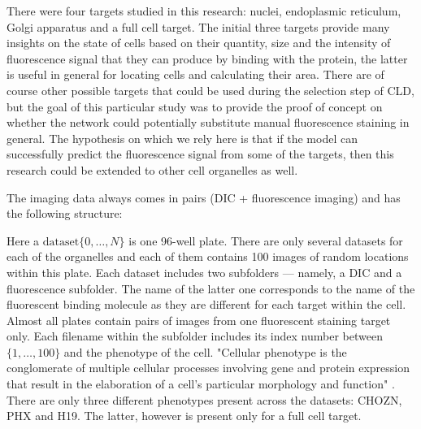 There were four targets studied in this research: nuclei, endoplasmic reticulum, Golgi apparatus and a full cell target. The initial three targets provide many insights on the state of cells based on their quantity, size and the intensity of fluorescence signal that they can produce by binding with the protein, the latter is useful in general for locating cells and calculating their area. There are of course other possible targets that could be used during the selection step of CLD, but the goal of this particular study was to provide the proof of concept on whether the network could potentially substitute manual fluorescence staining in general. The hypothesis on which we rely here is that if the model can successfully predict the fluorescence signal from some of the targets, then this research could be extended to other cell organelles as well.

The imaging data always comes in pairs (DIC + fluorescence imaging) and has the following structure:



Here a $\text{dataset}\{0, \ldots, N\}$ is one 96-well plate. There are only several datasets for each of the organelles and each of them contains 100 images of random locations within this plate. Each dataset includes two subfolders --- namely, a DIC and a fluorescence subfolder. The name of the latter one corresponds to the name of the fluorescent binding molecule as they are different for each target within the cell. Almost all plates contain pairs of images from one fluorescent staining target only. Each filename within the subfolder includes its index number between $\{1, \ldots, 100\}$ and the phenotype of the cell. "Cellular phenotype is the conglomerate of multiple cellular processes involving gene and protein expression that result in the elaboration of a cell's particular morphology and function" \cite{Sul_2009}. There are only three different phenotypes present across the datasets: CHOZN, PHX and H19. The latter, however is present only for a full cell target.

